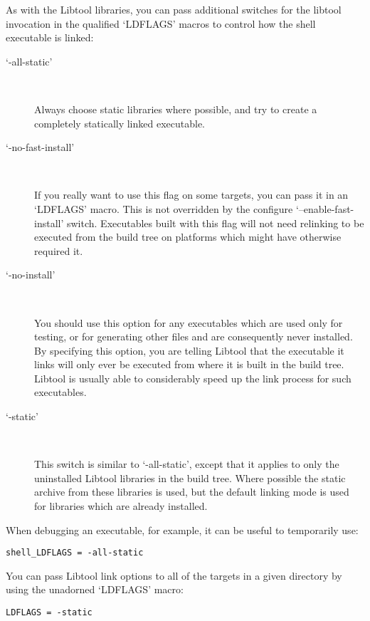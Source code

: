 As with the Libtool libraries, you can pass additional switches for the libtool invocation in the qualified `LDFLAGS' macros to control how the shell executable is linked: 

\begin{description}
\item[`-all-static']
\ 

%
Always choose static libraries where possible, and try to create a completely statically linked executable.

\item[`-no-fast-install'] 
\ 

%
If you really want to use this flag on some targets, you can pass it in an `LDFLAGS' macro. This is not overridden by the configure `--enable-fast-install' switch. Executables built with this flag will not need relinking to be executed from the build tree on platforms which might have otherwise required it. 

\item[`-no-install'] 
\ 

%
You should use this option for any executables which are used only for testing, or for generating other files and are consequently never installed. By specifying this option, you are telling Libtool that the executable it links will only ever be executed from where it is built in the build tree. Libtool is usually able to considerably speed up the link process for such executables. 

\item[`-static'] 
\ 

%
This switch is similar to `-all-static', except that it applies to only the uninstalled Libtool libraries in the build tree. Where possible the static archive from these libraries is used, but the default linking mode is used for libraries which are already installed. 
\end{description}

When debugging an executable, for example, it can be useful to temporarily use: 

\begin{Verbatim}[frame=single]
shell_LDFLAGS = -all-static
\end{Verbatim}


You can pass Libtool link options to all of the targets in a given 
directory by using the unadorned `LDFLAGS' macro: 

\begin{Verbatim}[frame=single]
LDFLAGS = -static
\end{Verbatim}

